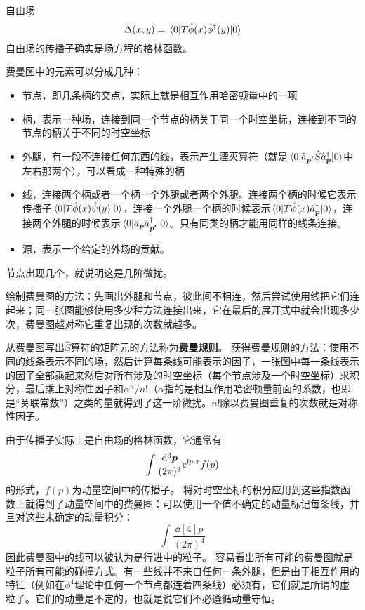 \documentclass[hyperref, UTF8, a4paper]{ctexart}
\newcommand*{\ii}{\mathrm{i}}
\newcommand*{\ee}{\mathrm{e}}
\begin{document}
自由场
\begin{equation}
    \Delta (x, y) = \mel{0}{T \hat{\phi} (x) \hat{\phi}^\dagger(y) }{0}
\end{equation}
自由场的传播子确实是场方程的格林函数。

费曼图中的元素可以分成几种：
\begin{itemize}
    \item 节点，即几条柄的交点，实际上就是相互作用哈密顿量中的一项
    \item 柄，表示一种场，连接到同一个节点的柄关于同一个时空坐标，连接到不同的节点的柄关于不同的时空坐标
    \item 外腿，有一段不连接任何东西的线，表示产生湮灭算符（就是$\mel{0}{\hat{a}_{\vb*{p'}}\hat{S}\hat{a}^\dagger_{\vb*{p}}}{0}$中左右那两个），可以看成一种特殊的柄
    \item 线，连接两个柄或者一个柄一个外腿或者两个外腿。连接两个柄的时候它表示传播子$\mel{0}{T\hat{\phi}(x)\hat{\psi}(y)}{0}$，连接一个外腿一个柄的时候表示$\mel{0}{T\hat{\phi}(x)\hat{a}^\dagger_{\vb*{p}}}{0}$，连接两个外腿的时候表示$\mel{0}{\hat{a}_{\vb*{p}}\hat{a}^\dagger_{\vb*{p'}}}{0}$。只有同类的柄才能用同样的线条连接。
    \item 源，表示一个给定的外场的贡献。
\end{itemize}
节点出现几个，就说明这是几阶微扰。


绘制费曼图的方法：先画出外腿和节点，彼此间不相连，然后尝试使用线把它们连起来；同一张图能够使用多少种方法连接出来，它在最后的展开式中就会出现多少次，费曼图越对称它重复出现的次数就越多。

从费曼图写出$\hat{S}$算符的矩阵元的方法称为\textbf{费曼规则}。
获得费曼规则的方法：使用不同的线条表示不同的场，然后计算每条线可能表示的因子，一张图中每一条线表示的因子全部乘起来然后对所有涉及的时空坐标（每个节点涉及一个时空坐标）求积分，最后乘上对称性因子和$\alpha^n/n!$（$\alpha$指的是相互作用哈密顿量前面的系数，也即是“关联常数”）之类的量就得到了这一阶微扰。$n!$除以费曼图重复的次数就是对称性因子。

由于传播子实际上是自由场的格林函数，它通常有
\[
    \int \frac{\dd[3]{\vb*{p}}}{(2\pi)^3} \ee^{\ii p \cdot x} f(p)
\]
的形式，$f(p)$为动量空间中的传播子。
将对时空坐标的积分应用到这些指数函数上就得到了动量空间中的费曼图：可以使用一个值不确定的动量标记每条线，并且对这些未确定的动量积分：
\[
    \int \frac{\dd[4]p}{(2\pi)^4}
\]
因此费曼图中的线可以被认为是行进中的粒子。
容易看出所有可能的费曼图就是粒子所有可能的碰撞方式。有一些线并不来自任何一条外腿，但是由于相互作用的特征（例如在$\phi^4$理论中任何一个节点都连着四条线）必须有，它们就是所谓的虚粒子。它们的动量是不定的，也就是说它们不必遵循动量守恒。
\end{document}
